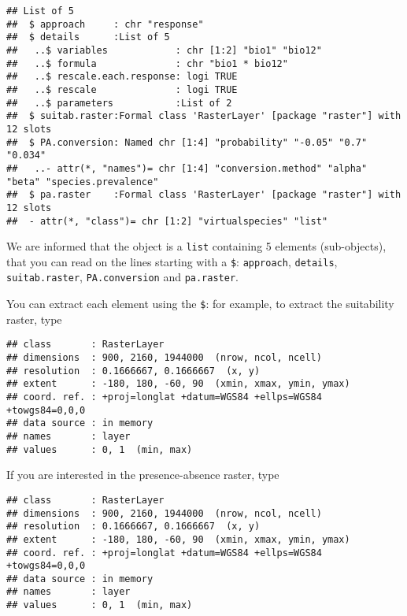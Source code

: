 \documentclass[]{article}
\newenvironment{Shaded}{\begin{snugshade}}{\end{snugshade}}
\newcommand{\OperatorTok}[1]{\textcolor[rgb]{0.81,0.36,0.00}{\textbf{#1}}}
\newcommand{\NormalTok}[1]{#1}
\begin{document}
\begin{verbatim}
## List of 5
##  $ approach     : chr "response"
##  $ details      :List of 5
##   ..$ variables            : chr [1:2] "bio1" "bio12"
##   ..$ formula              : chr "bio1 * bio12"
##   ..$ rescale.each.response: logi TRUE
##   ..$ rescale              : logi TRUE
##   ..$ parameters           :List of 2
##  $ suitab.raster:Formal class 'RasterLayer' [package "raster"] with 12 slots
##  $ PA.conversion: Named chr [1:4] "probability" "-0.05" "0.7" "0.034"
##   ..- attr(*, "names")= chr [1:4] "conversion.method" "alpha" "beta" "species.prevalence"
##  $ pa.raster    :Formal class 'RasterLayer' [package "raster"] with 12 slots
##  - attr(*, "class")= chr [1:2] "virtualspecies" "list"
\end{verbatim}

We are informed that the object is a \texttt{list} containing 5 elements
(sub-objects), that you can read on the lines starting with a
\texttt{\$}: \texttt{approach}, \texttt{details},
\texttt{suitab.raster}, \texttt{PA.conversion} and \texttt{pa.raster}.

You can extract each element using the \texttt{\$}: for example, to
extract the suitability raster, type

\begin{Shaded}
\end{Shaded}

\begin{verbatim}
## class       : RasterLayer 
## dimensions  : 900, 2160, 1944000  (nrow, ncol, ncell)
## resolution  : 0.1666667, 0.1666667  (x, y)
## extent      : -180, 180, -60, 90  (xmin, xmax, ymin, ymax)
## coord. ref. : +proj=longlat +datum=WGS84 +ellps=WGS84 +towgs84=0,0,0 
## data source : in memory
## names       : layer 
## values      : 0, 1  (min, max)
\end{verbatim}

If you are interested in the presence-absence raster, type

\begin{Shaded}
\end{Shaded}

\begin{verbatim}
## class       : RasterLayer 
## dimensions  : 900, 2160, 1944000  (nrow, ncol, ncell)
## resolution  : 0.1666667, 0.1666667  (x, y)
## extent      : -180, 180, -60, 90  (xmin, xmax, ymin, ymax)
## coord. ref. : +proj=longlat +datum=WGS84 +ellps=WGS84 +towgs84=0,0,0 
## data source : in memory
## names       : layer 
## values      : 0, 1  (min, max)
\end{verbatim}
\end{document}
